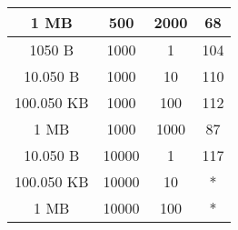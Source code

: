 \begin{table}[h]
\begin{tabular}{|c|c|c|c|}
1 MB                                & 500                           & 2000             & 68                                                                         \\ \hline
1050 B                              & 1000                          & 1                & 104                                                                        \\ \hline
10.050 B                            & 1000                          & 10               & 110                                                                        \\ \hline
100.050 KB                          & 1000                          & 100              & 112                                                                        \\ \hline
1 MB                                & 1000                          & 1000             & 87                                                                         \\ \hline
10.050 B                            & 10000                         & 1                & 117                                                                        \\ \hline
100.050 KB                          & 10000                         & 10               & *                                                                          \\ \hline
1 MB                                & 10000                         & 100              & *                                                                          \\ \hline
\end{tabular}
\end{table}

